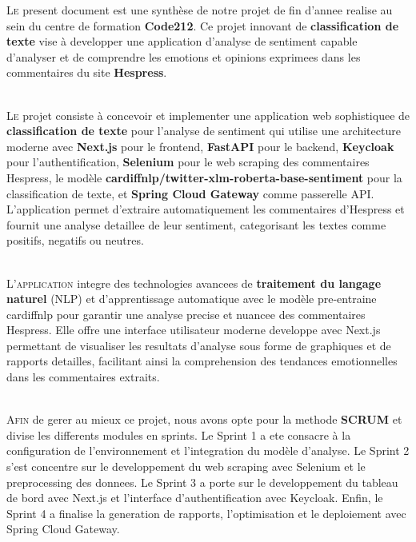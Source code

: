 
\lettrine[nindent=0em, slope=.5em] {\color{Eblue}L}{e} present document est une synthèse de notre projet de fin d'annee realise au sein du centre de formation \textbf{Code212}. Ce projet innovant de \textbf{classification de texte} vise à developper une application d'analyse de sentiment capable d'analyser et de comprendre les emotions et opinions exprimees dans les commentaires du site \textbf{Hespress}.

\ \\

\lettrine[nindent=0em, slope=.5em] {\color{Eblue}L}{e} projet consiste à concevoir et implementer une application web sophistiquee de \textbf{classification de texte} pour l'analyse de sentiment qui utilise une architecture moderne avec \textbf{Next.js} pour le frontend, \textbf{FastAPI} pour le backend, \textbf{Keycloak} pour l'authentification, \textbf{Selenium} pour le web scraping des commentaires Hespress, le modèle \textbf{cardiffnlp/twitter-xlm-roberta-base-sentiment} pour la classification de texte, et \textbf{Spring Cloud Gateway} comme passerelle API. L'application permet d'extraire automatiquement les commentaires d'Hespress et fournit une analyse detaillee de leur sentiment, categorisant les textes comme positifs, negatifs ou neutres.

\ \\

\lettrine[nindent=0em, slope=.5em] {\color{Eblue}L}{'application} integre des technologies avancees de \textbf{traitement du langage naturel} (NLP) et d'apprentissage automatique avec le modèle pre-entraine cardiffnlp pour garantir une analyse precise et nuancee des commentaires Hespress. Elle offre une interface utilisateur moderne developpe avec Next.js permettant de visualiser les resultats d'analyse sous forme de graphiques et de rapports detailles, facilitant ainsi la comprehension des tendances emotionnelles dans les commentaires extraits.

\ \\

\lettrine[nindent=0em, slope=.5em] {\color{Eblue}A}{fin} de gerer au mieux ce projet, nous avons opte pour la methode \textbf{SCRUM} et divise les differents modules en sprints. Le Sprint 1 a ete consacre à la configuration de l'environnement et l'integration du modèle d'analyse. Le Sprint 2 s'est concentre sur le developpement du web scraping avec Selenium et le preprocessing des donnees. Le Sprint 3 a porte sur le developpement du tableau de bord avec Next.js et l'interface d'authentification avec Keycloak. Enfin, le Sprint 4 a finalise la generation de rapports, l'optimisation et le deploiement avec Spring Cloud Gateway.

